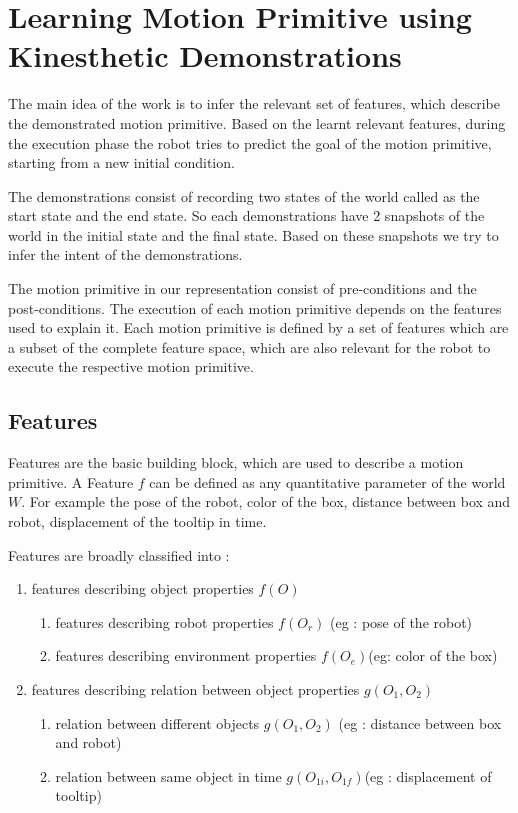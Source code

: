 \section{Learning Motion Primitive using Kinesthetic Demonstrations}
\label{sec:Learning motion primitive}
The main idea of the work is to infer the relevant set of features,
which describe the demonstrated motion primitive.
Based on the learnt relevant features, during the execution phase 
the robot tries to predict the goal of the motion primitive, starting 
from a new initial condition.

The demonstrations consist of recording two  states of the world
called as the start state and the end state.
So each demonstrations have 2 snapshots of the world in the initial state and the final state.
Based on these snapshots we try to infer the intent of the demonstrations. 

The motion primitive in our representation consist of pre-conditions and the post-conditions.
The execution of each motion primitive depends on the features used to explain it.
Each motion primitive is defined by a set of features which are a subset of the complete feature space, 
which are also relevant for the robot to execute the respective motion primitive.

\subsection{Features}
Features are the basic building block, which are used to describe a motion primitive.
A Feature $f$ can be defined as any quantitative parameter of the world $W$.
For example the pose of the robot, color of the box, distance between box and robot,
displacement of the tooltip in time.

Features are broadly classified into :
\begin{enumerate}
    \item features describing object properties $f(O)$
    \begin{enumerate}
        \item features describing robot properties $f(O_r)$ (eg : pose of the robot)
        \item features describing environment properties $f(O_e)$(eg: color of the box)
    \end{enumerate}
    \item features describing relation between object properties $g(O_1, O_2)$
    \begin{enumerate}
        \item relation between  different objects $g(O_1, O_2)$ (eg : distance between box and robot)
        \item relation between same object in time $g(O_{1i}, O_{1f}) $(eg : displacement of tooltip)
    \end{enumerate}
\end{enumerate}


